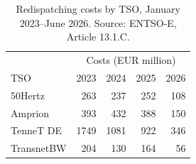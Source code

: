 \begin{table}[ht]
\caption{Redispatching costs by TSO, January 2023--June 2026. Source: ENTSO-E, Article 13.1.C.}
\begin{tabular}{lrrrr}
\toprule
 & \multicolumn{4}{c}{Costs (EUR million)} \\
TSO & 2023 & 2024 & 2025 & 2026 \\
\midrule
50Hertz & 263 & 237 & 252 & 108 \\
Amprion & 393 & 432 & 388 & 150 \\
TenneT DE & 1749 & 1081 & 922 & 346 \\
TransnetBW & 204 & 130 & 164 & 56 \\
\bottomrule
\end{tabular}
\end{table}
